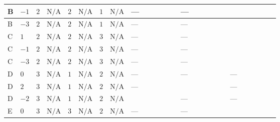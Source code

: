 \documentclass[8pt]{article}
\begin{document}
\begin{landscape}
\begin{longtable}{@{}llcccccc >{\raggedright\arraybackslash}p{0.21\linewidth} >{\raggedright\arraybackslash}p{0.21\linewidth} >{\raggedright\arraybackslash}p{0.21\linewidth}@{}}
\midrule
B & $-1$ & $2$ & $\text{N/A}$ & $2$ & $\text{N/A}$ & $1$ & $\text{N/A}$ & --- & --- & \scriptsize\adjustbox{max width=\linewidth}{$\begin{gathered} +\frac{9 {g_2}^4}{4}\end{gathered}$} \\
\midrule
B & $-3$ & $2$ & $\text{N/A}$ & $2$ & $\text{N/A}$ & $1$ & $\text{N/A}$ & --- & --- & \scriptsize\adjustbox{max width=\linewidth}{$\begin{gathered} +\frac{9 {g_2}^4}{4}\end{gathered}$} \\
\midrule
C & $1$ & $2$ & $\text{N/A}$ & $2$ & $\text{N/A}$ & $3$ & $\text{N/A}$ & --- & --- & \scriptsize\adjustbox{max width=\linewidth}{$\begin{gathered} +\frac{9 {g_2}^4}{4}\end{gathered}$} \\
\midrule
C & $-1$ & $2$ & $\text{N/A}$ & $2$ & $\text{N/A}$ & $3$ & $\text{N/A}$ & --- & --- & \scriptsize\adjustbox{max width=\linewidth}{$\begin{gathered} +\frac{9 {g_2}^4}{4}\end{gathered}$} \\
\midrule
C & $-3$ & $2$ & $\text{N/A}$ & $2$ & $\text{N/A}$ & $3$ & $\text{N/A}$ & --- & --- & \scriptsize\adjustbox{max width=\linewidth}{$\begin{gathered} +\frac{9 {g_2}^4}{4}\end{gathered}$} \\
\midrule
D & $0$ & $3$ & $\text{N/A}$ & $1$ & $\text{N/A}$ & $2$ & $\text{N/A}$ & --- & --- & --- \\
\midrule
D & $2$ & $3$ & $\text{N/A}$ & $1$ & $\text{N/A}$ & $2$ & $\text{N/A}$ & --- & \scriptsize\adjustbox{max width=\linewidth}{$\begin{gathered} +48 {g_1}^4\end{gathered}$} & --- \\
\midrule
D & $-2$ & $3$ & $\text{N/A}$ & $1$ & $\text{N/A}$ & $2$ & $\text{N/A}$ & \scriptsize\adjustbox{max width=\linewidth}{$\begin{gathered} +4 {\lambda_{X_{7}}^{(1)}} (3 \left({\lambda_{X_{2}}}\right)^{*}+4 \left({\lambda_{X_{7}}^{(1)}}\right)^{*})\end{gathered}$} & --- & --- \\
\midrule
E & $0$ & $3$ & $\text{N/A}$ & $3$ & $\text{N/A}$ & $2$ & $\text{N/A}$ & --- & --- & \scriptsize\adjustbox{max width=\linewidth}{$\begin{gathered} +\frac{63 {g_2}^4}{5}\end{gathered}$} \\

\end{longtable}
\end{landscape}
\end{document}
